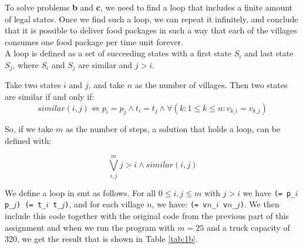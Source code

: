 \documentclass[a4paper]{article}
\begin{document}
	To solve problems \textbf{b} and \textbf{c}, we need to find a loop that includes a finite amount of legal states. Once we find such a loop, we can repeat it infinitely, and conclude that it is possible to deliver food packages in such a way that each of the villages consumes one food package per time unit forever.\\
	
	A loop is defined as a set of succeeding states with a first state $S_i$ and last state $S_j$, where $S_i$ and $S_j$ are similar and $j > i$.
	
	Take two states $i$ and $j$, and take $n$ as the number of villages. Then two states are similar if and only if:
	$$similar(i, j) \Leftrightarrow p_i = p_j \wedge t_i = t_j \wedge \forall (k: 1 \leq k \leq n : v_{k\_i} = v_{k\_j})$$
	
	So, if we take $m$ as the number of steps, a solution that holds a loop, can be defined with:
	
	$$\bigvee_{i, j}^m j > i \wedge similar(i, j)$$
	
	We define a loop in smt as follows. For all $0 \leq i, j \leq m$ with $j > i$ we have {\tt (= p\_$i$ p\_$j$) (= t\_$i$ t\_$j$)}, and for each village $n$, we have: {\tt (= v$n$\_$i$ v$n$\_$j$)}. We then include this code together with the original code from the previous part of this assignment and when we run the program with $m=25$ and a truck capacity of 320, we get the result that is shown in Table \ref{tab:1b}.\\
	
\end{document}
